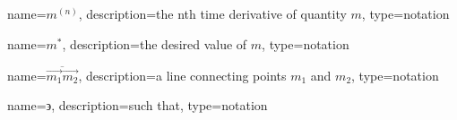 	\newcommand{\tdern}[2]{\ensuremath{{#1}^{(#2)}}}
	{%
		name=\tdern{m}{n},
		description=the nth time derivative of quantity $m$,
		type=notation
	}

	\newcommand{\desired}[1]{\ensuremath{{#1}^{*}}}
	{%
		name=\desired{m},
		description=the desired value of $m$,
		type=notation
	}

	\newcommand{\vecline}[2]{\ensuremath{\overline{#1#2}}}
	{%
		name=\ensuremath{\vecline{\vec{m_1}}{\vec{m_2}}},
		description=a line connecting points $m_1$ and $m_2$,
		type=notation
	}

	{%
		name={\ensuremath{\backepsilon}},
		description=such that,
		type=notation
	}
	\newcommand{\suchthat}{\gls{not:suchthat}}

	\DeclarePairedDelimiter{\ceil}{\lceil}{\rceil}
	\DeclarePairedDelimiter{\floor}{\lfloor}{\rfloor}

	\DeclareMathOperator{\rank}{rank}
